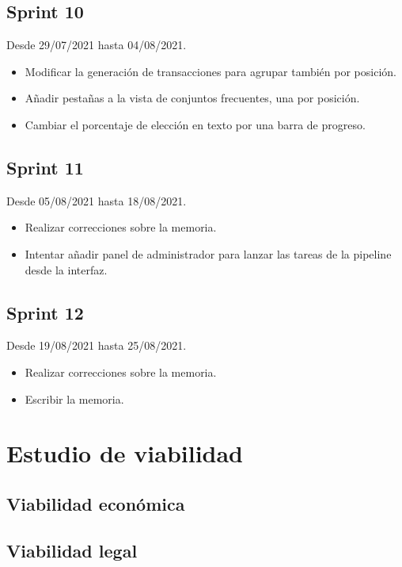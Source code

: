 \subsection{Sprint 10}

Desde 29/07/2021 hasta 04/08/2021.

\begin{itemize}
	\item Modificar la generación de transacciones para agrupar también por posición.
	\item Añadir pestañas a la vista de conjuntos frecuentes, una por posición.
	\item Cambiar el porcentaje de elección en texto por una barra de progreso.
\end{itemize}

\subsection{Sprint 11}

Desde 05/08/2021 hasta 18/08/2021.

\begin{itemize}
	\item Realizar correcciones sobre la memoria.
	\item Intentar añadir panel de administrador para lanzar las tareas de la pipeline desde la interfaz.
\end{itemize}

\subsection{Sprint 12}

Desde 19/08/2021 hasta 25/08/2021.

\begin{itemize}
	\item Realizar correcciones sobre la memoria.
	\item Escribir la memoria.
\end{itemize}

\section{Estudio de viabilidad}

\subsection{Viabilidad económica}

\subsection{Viabilidad legal}


